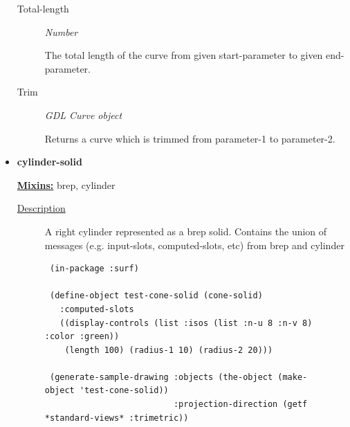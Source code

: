 \documentclass [11pt]{book}
\begin{document}
\begin{itemize}
\begin{description}
\item [Total-length]
\emph{Number}

 The total length of the curve from given start-parameter to given end-parameter.




\item [Trim]
\emph{GDL Curve object}

 Returns a curve which is trimmed from parameter-1 to parameter-2.




\end{description}







\item {}
\label{prim:cylinder-solid}
\textbf{cylinder-solid}


\textbf{
\underline{Mixins:}} brep, cylinder





\begin{description}

\item [
\underline{Description}]


A right cylinder represented as a brep solid. Contains the union of messages (e.g. input-slots, computed-slots, etc)
from brep and cylinder



\end{description}




\begin{figure}
\begin{lrbox}{\boxedverb}
\begin{minipage}{\linewidth}
{\small

\begin{verbatim}
 (in-package :surf)

 (define-object test-cone-solid (cone-solid)
   :computed-slots
   ((display-controls (list :isos (list :n-u 8 :n-v 8) :color :green))
    (length 100) (radius-1 10) (radius-2 20)))
 
 (generate-sample-drawing :objects (the-object (make-object 'test-cone-solid))
                          :projection-direction (getf *standard-views* :trimetric))


\end{verbatim}}
\end{minipage}
\end{lrbox}
\fbox{\usebox{\boxedverb}}


\end{figure}
\end{itemize}
\end{document}
